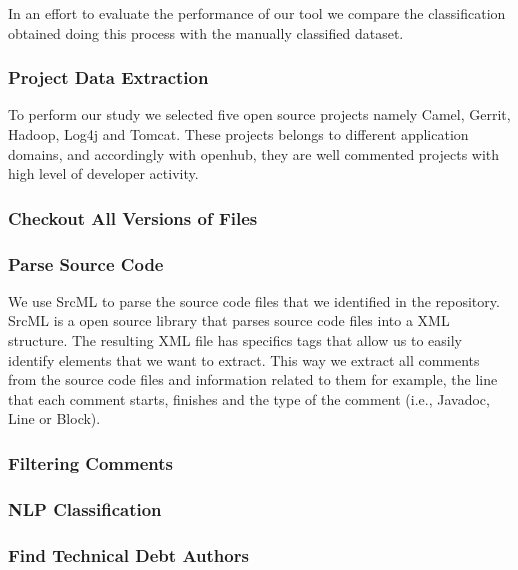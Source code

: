 In an effort to evaluate the performance of our tool we compare the \SATD classification obtained doing this process with the manually classified dataset. 

\subsubsection*{Project Data Extraction}
\label{subsub:project_data_extraction}

To perform our study we selected five open source projects namely Camel, Gerrit, Hadoop, Log4j and Tomcat. These projects belongs to different application domains, and accordingly with openhub, they are well commented projects  with high level of developer activity. 


\subsubsection*{Checkout All Versions of Files}
\label{subsub:checkout_all_versions_of_files}

\subsubsection*{Parse Source Code}
\label{subsub:parse_source_code}
We use SrcML \cite{srcml} to parse the source code files that we identified in the repository. SrcML is a open source library that parses source code files into a XML structure. The resulting XML file has specifics tags that allow us to easily identify elements that we want to extract. This way we extract all comments from the source code files and information related to them for example, the line that each comment starts, finishes and the type of the comment (i.e., Javadoc, Line or Block).


\subsubsection*{Filtering Comments}
\label{subsub:filtering_comments}

\subsubsection*{NLP Classification}
\label{subsub:nlp_classification}

\subsubsection*{Find Technical Debt Authors}
\label{subsub:find_technical_debt_authors}

